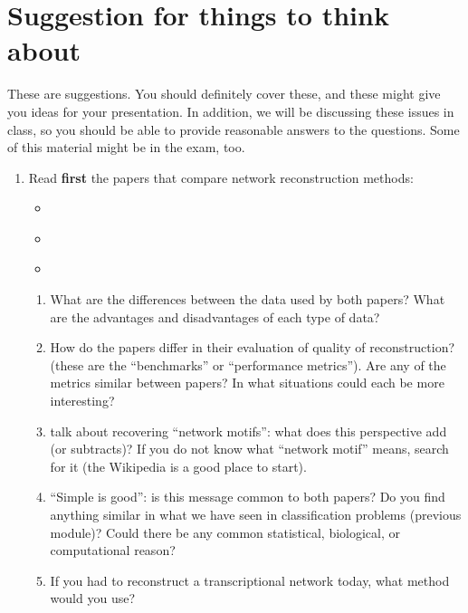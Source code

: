 

\section{Suggestion for things to think about}

These are suggestions. You should definitely cover these, and these might
give you ideas for your presentation. In addition, we will be discussing
these issues in class, so you should be able to provide reasonable answers
to the questions. Some of this material might be in the exam, too.



\begin{enumerate}
\item Read \textbf{first} the papers that compare network reconstruction
  methods: 
  
  \begin{itemize}\label{net1}

    \item \cite{Marbach2012}
  \item \cite{Marbach2010} %
  \item \cite{Narendra2011} %
  \end{itemize}

  \begin{enumerate}
    
  \item What are the differences between the data used by both papers? What
    are the advantages and disadvantages of each type of data?
  \item How do the papers differ in their evaluation of quality of
    reconstruction? (these are the ``benchmarks'' or ``performance
    metrics''). Are any of the metrics similar between papers? In what
    situations could each be more interesting?
  \item \cite{Marbach2010} %
    talk about recovering ``network motifs'': what does this perspective add
    (or subtracts)? If you do not know what ``network motif'' means, search
    for it (the Wikipedia is a good place to start).
    
  \item ``Simple is good'': is this message common to both papers? Do you
    find anything similar in what we have seen in classification problems
    (previous module)? Could there be any common statistical, biological, or
    computational reason?
  \item If you had to reconstruct a transcriptional network today, what
    method would you use?
    

\end{enumerate}
\end{enumerate}
